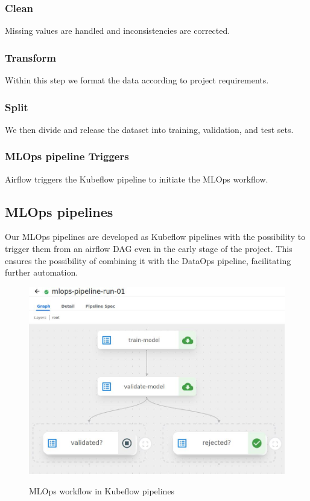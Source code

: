 \subsubsection{Clean}
Missing values are handled and inconsistencies are corrected.

\subsubsection{Transform}
Within this step we format the data according to project requirements.

\subsubsection{Split}
We then divide and release the dataset into training, validation, and test sets.

\subsubsection{MLOps pipeline Triggers}
Airflow triggers the Kubeflow pipeline to initiate the MLOps workflow.

\subsection{MLOps pipelines}\label{subsec:mlops-pipelines}
Our MLOps pipelines are developed as Kubeflow pipelines with the possibility to trigger them from an airflow DAG
even in the early stage of the project.
This ensures the possibility of combining it with the DataOps pipeline, facilitating further automation.

\begin{figure}[!htbp]
    \centering
    \caption{MLOps workflow in Kubeflow pipelines}
    \includegraphics[scale=0.3]{images/project/mlops-workflow-kubeflow}
    \label{fig:mlops-workflow-kubeflow}
\end{figure}

